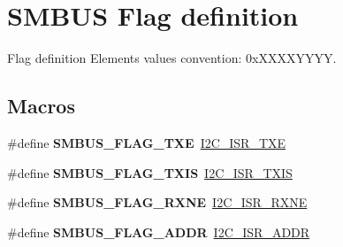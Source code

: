 \hypertarget{group___s_m_b_u_s___flag__definition}{}\section{S\+M\+B\+US Flag definition}
\label{group___s_m_b_u_s___flag__definition}


Flag definition Elements values convention\+: 0x\+X\+X\+X\+X\+Y\+Y\+YY.  


\subsection*{Macros}
\begin{DoxyCompactItemize}
\item 
\mbox{\label{group___s_m_b_u_s___flag__definition_ga0c1a8cdceea7aec32cc0ba24894e0f1c}} 
\#define {\bfseries S\+M\+B\+U\+S\+\_\+\+F\+L\+A\+G\+\_\+\+T\+XE}~\hyperlink{group___peripheral___registers___bits___definition_ga1dfec198395c0f88454a86bacff60351}{I2\+C\+\_\+\+I\+S\+R\+\_\+\+T\+XE}
\item 
\mbox{\label{group___s_m_b_u_s___flag__definition_ga4b435b09ea066d2bce895e9d18584d08}} 
\#define {\bfseries S\+M\+B\+U\+S\+\_\+\+F\+L\+A\+G\+\_\+\+T\+X\+IS}~\hyperlink{group___peripheral___registers___bits___definition_gaa848ab3d120a27401203329941c9dcb5}{I2\+C\+\_\+\+I\+S\+R\+\_\+\+T\+X\+IS}
\item 
\mbox{\label{group___s_m_b_u_s___flag__definition_gab4dc38eb1d6c122e3e497e330cc57b12}} 
\#define {\bfseries S\+M\+B\+U\+S\+\_\+\+F\+L\+A\+G\+\_\+\+R\+X\+NE}~\hyperlink{group___peripheral___registers___bits___definition_ga0afd4e99e26dcec57a0f3be4dae2c022}{I2\+C\+\_\+\+I\+S\+R\+\_\+\+R\+X\+NE}
\item 
\mbox{\label{group___s_m_b_u_s___flag__definition_gab8815718b8c301f67386c8820ebfad9e}} 
\#define {\bfseries S\+M\+B\+U\+S\+\_\+\+F\+L\+A\+G\+\_\+\+A\+D\+DR}~\hyperlink{group___peripheral___registers___bits___definition_ga0c1a844fb3e55ca9db318d0bc2db4a07}{I2\+C\+\_\+\+I\+S\+R\+\_\+\+A\+D\+DR}
\item 
\mbox{\label{group___s_m_b_u_s___flag__definition_ga20a20a983bba9f5a470e3add6c93dd5d}} 

\end{DoxyCompactItemize}
